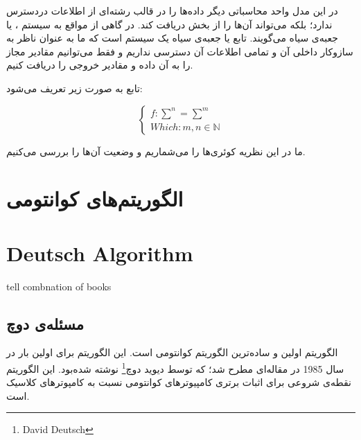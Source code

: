 \documentclass{book}
\begin{document}
در این مدل واحد محاسباتی دیگر داده‌ها را در قالب رشته‌ای از اطلاعات دردسترس ندارد؛ بلکه می‌تواند آن‌ها را از بخش  دریافت کند. در گاهی از مواقع به سیستم ،‌ یا جعبه‌ی سیاه می‌گویند. تابع  یا جعبه‌ی سیاه یک سیستم است که ما به عنوان ناظر به سازوکار داخلی آن و  تمامی اطلاعات آن دسترسی نداریم و فقط می‌توانیم مقادیر مجاز را به آن داده و مقادیر خروجی را دریافت کنیم. 

تابع  به صورت زیر تعریف می‌شود:
\begin{center}
$$
\left\{
\begin{array}{ll}
f : \sum^n = \sum^m\\
Which : m, n \in \mathbb{N}
\end{array}
\right.
$$
\end{center}

ما در این نظریه کوئری‌ها را می‌شماریم و وضعیت آن‌‌ها را بررسی می‌کنیم.

\section*{الگوریتم‌های کوانتومی}


	
\section{Deutsch Algorithm}
tell combnation of books
\subsection{مسئله‌ی دوچ}
الگوریتم  اولین و ساده‌ترین الگوریتم کوانتومی‌ است. این الگوریتم برای اولین بار در سال 1985 در مقاله‌ای مطرح شد؛ که توسط دیوید دوچ\footnote{David Deutsch} نوشته شده‌‌بود. این الگوریتم نقطه‌ی شروعی برای اثبات برتری کامپیوترهای کوانتومی نسبت به کامپوترهای کلاسیک است.
\end{document}

